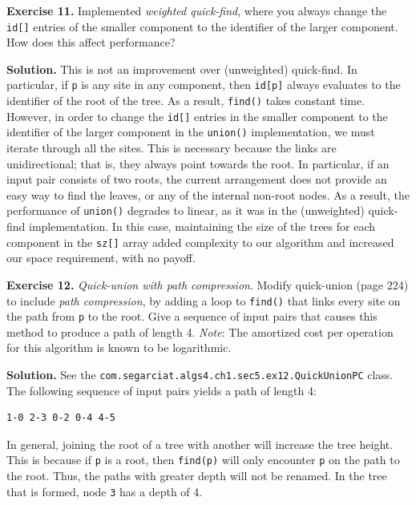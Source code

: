 \documentclass[12pt, a4paper]{article}
\newenvironment{ex}[2][Exercise]
{\par\medskip\noindent \textbf{#1 #2.}}
{\medskip}
\newenvironment{sol}[1][Solution]
{\par\medskip\noindent \textbf{#1.} }
{\medskip}
\begin{document}
	\begin{ex}{11}
		Implemented \emph{weighted quick-find}, where you always change the \texttt{id[]}
		entries of the smaller component to the identifier of the larger component.
		How does this affect performance?
	\end{ex}
	\begin{sol}
		This is not an improvement over (unweighted) quick-find. In particular, if \texttt{p} is any
		site in any component, then \texttt{id[p]} always evaluates to the identifier of
		the root of the tree. As a result, \texttt{find()} takes constant time. However,
		in order to change the \texttt{id[]} entries in the smaller component to the
		identifier of the larger component in the \texttt{union()} implementation, we must
		iterate through all the sites. This is necessary because the links are
		unidirectional; that is, they always point towards the root. In particular,
		if an input pair consists of two roots, the current arrangement does not
		provide an easy way to find the leaves, or any of the internal non-root
		nodes. As a result, the performance of \texttt{union()} degrades to linear,
		as it was in the (unweighted) quick-find implementation. In this case,
		maintaining the size of the trees for each component in the \texttt{sz[]} array
		added complexity to our algorithm and increased our space requirement,
		with no payoff.
	\end{sol}
	\begin{ex}{12}
		\emph{Quick-union with path compression}. Modify quick-union (page 224) to include
		\emph{path compression}, by adding a loop to \texttt{find()} that links every site
		on the path from \texttt{p} to the root. Give a sequence of input pairs that causes
		this method to produce a path of length 4. \emph{Note}: The amortized cost per
		operation for this algorithm is known to be logarithmic.
	\end{ex}
	\begin{sol}
		See the \texttt{com.segarciat.algs4.ch1.sec5.ex12.QuickUnionPC} class. The following
		sequence of input pairs yields a path of length 4:
		\begin{lstlisting}[language={}]
1-0 2-3 0-2 0-4 4-5
		\end{lstlisting}
		In general, joining the root of a tree with another will increase the tree height.
		This is because if \texttt{p} is a root, then \texttt{find(p)} will only encounter
		\texttt{p} on the path to the root. Thus, the paths with greater depth will not
		be renamed. In the tree that is formed, node \texttt{3} has a depth of 4.
	\end{sol}
\end{document}
